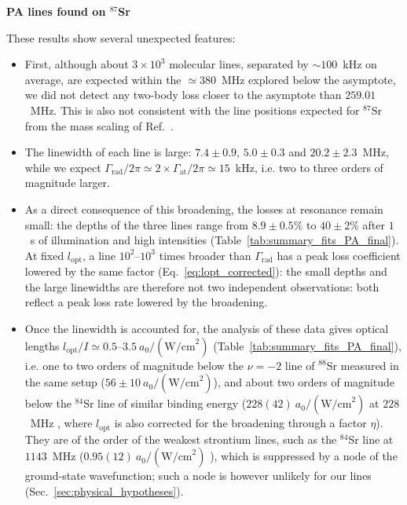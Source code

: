 \textbf{PA lines found on $^{87}$Sr}

These results show several unexpected features:

\begin{itemize}
    \item First, although about $3\times10^3$ molecular lines, separated by $\sim100$~kHz on average, are expected within the $\simeq380$~MHz explored below the asymptote, we did not detect any two-body loss closer to the asymptote than $259.01$~MHz. This is also not consistent with the line positions expected for $^{87}$Sr from the mass scaling of Ref.~\cite{borkowski_mass_2014}.
    \item The linewidth of each line is large: $7.4 \pm 0.9$, $5.0 \pm 0.3$ and $20.2 \pm 2.3$~MHz, while we expect $\Gamma_{\text{rad}}/2\pi \simeq 2\times \Gamma_{\text{at}}/2\pi \simeq 15$~kHz, i.e. two to three orders of magnitude larger.
    \item As a direct consequence of this broadening, the losses at resonance remain small: the depths of the three lines range from $8.9\pm0.5\%$ to $40\pm2\%$ after $1$~s of illumination and high intensities (Table~\ref{tab:summary_fits_PA_final}). At fixed $l_{\text{opt}}$, a line $10^2$--$10^3$ times broader than $\Gamma_{\text{rad}}$ has a peak loss coefficient lowered by the same factor (Eq.~\ref{eq:lopt_corrected}): the small depths and the large linewidths are therefore not two independent observations: both reflect a peak loss rate lowered by the broadening.
    \item Once the linewidth is accounted for, the analysis of these data gives optical lengths $l_{\text{opt}}/I \simeq 0.5$--$3.5~a_0/(\text{W/cm}^2)$ (Table~\ref{tab:summary_fits_PA_final}), i.e. one to two orders of magnitude below the $\nu=-2$ line of $^{88}\text{Sr}$ measured in the same setup ($56\pm10~a_0/(\text{W/cm}^2)$), and about two orders of magnitude below the $^{84}$Sr line of similar binding energy ($228(42)~a_0/(\text{W/cm}^2)$ at $228$~MHz \cite{reschovsky_narrow-line_2018}, where $l_{\text{opt}}$ is also corrected for the broadening through a factor $\eta$). They are of the order of the weakest strontium lines, such as the $^{84}$Sr line at $1143$~MHz ($0.95(12)~a_0/(\text{W/cm}^2)$ \cite{reschovsky_narrow-line_2018}), which is suppressed by a node of the ground-state wavefunction; such a node is however unlikely for our lines (Sec.~\ref{sec:physical_hypotheses}).
\end{itemize}


